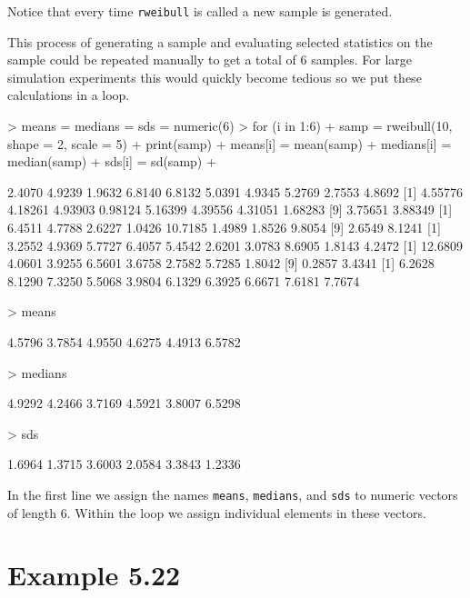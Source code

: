 \documentclass{book}
\begin{document}
Notice that every time \texttt{rweibull} is called a new sample is generated.

This process of generating a sample and evaluating selected statistics
on the sample could be repeated manually to get a total of 6 samples.
For large simulation experiments this would quickly become tedious so
we put these calculations in a loop.
\begin{Schunk}
\begin{Sinput}
> means = medians = sds = numeric(6)
> for (i in 1:6) {
+     samp = rweibull(10, shape = 2, scale = 5)
+     print(samp)
+     means[i] = mean(samp)
+     medians[i] = median(samp)
+     sds[i] = sd(samp)
+ }
\end{Sinput}
\begin{Soutput}
 [1] 2.4070 4.9239 1.9632 6.8140 6.8132 5.0391 4.9345 5.2769 2.7553 4.8692
 [1] 4.55776 4.18261 4.93903 0.98124 5.16399 4.39556 4.31051 1.68283
 [9] 3.75651 3.88349
 [1]  6.4511  4.7788  2.6227  1.0426 10.7185  1.4989  1.8526  9.8054
 [9]  2.6549  8.1241
 [1] 3.2552 4.9369 5.7727 6.4057 5.4542 2.6201 3.0783 8.6905 1.8143 4.2472
 [1] 12.6809  4.0601  3.9255  6.5601  3.6758  2.7582  5.7285  1.8042
 [9]  0.2857  3.4341
 [1] 6.2628 8.1290 7.3250 5.5068 3.9804 6.1329 6.3925 6.6671 7.6181 7.7674
\end{Soutput}
\begin{Sinput}
> means
\end{Sinput}
\begin{Soutput}
[1] 4.5796 3.7854 4.9550 4.6275 4.4913 6.5782
\end{Soutput}
\begin{Sinput}
> medians
\end{Sinput}
\begin{Soutput}
[1] 4.9292 4.2466 3.7169 4.5921 3.8007 6.5298
\end{Soutput}
\begin{Sinput}
> sds
\end{Sinput}
\begin{Soutput}
[1] 1.6964 1.3715 3.6003 2.0584 3.3843 1.2336
\end{Soutput}
\end{Schunk}
In the first line we assign the names \texttt{means},
\texttt{medians}, and \texttt{sds} to numeric vectors of length 6.
Within the loop we assign individual elements in these vectors.


\section{Example 5.22}
\label{sec:xmp0522}
\end{document}
